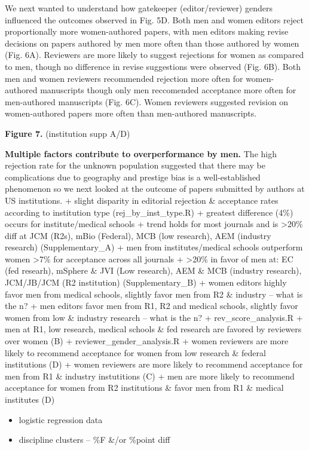 \documentclass[11pt,]{article}
\providecommand{\tightlist}{%
  \setlength{\itemsep}{0pt}\setlength{\parskip}{0pt}}
\begin{document}
We next wanted to understand how gatekeeper (editor/reviewer) genders
influenced the outcomes observed in Fig. 5D. Both men and women editors
reject proportionally more women-authored papers, with men editors
making revise decisions on papers authored by men more often than those
authored by women (Fig. 6A). Reviewers are more likely to suggest
rejections for women as compared to men, though no difference in revise
suggestions were observed (Fig. 6B). Both men and women reviewers
recommended rejection more often for women-authored manuscripts though
only men reccomended acceptance more often for men-authored manuscripts
(Fig. 6C). Women reviewers suggested revision on women-authored papers
more often than men-authored manuscripts.

\textbf{Figure 7.} (institution supp A/D)

\textbf{Multiple factors contribute to overperformance by men.} The high
rejection rate for the unknown population suggested that there may be
complications due to geography and prestige bias is a well-established
phenomenon so we next looked at the outcome of papers submitted by
authors at US institutions. + slight disparity in editorial rejection \&
acceptance rates according to institution type (rej\_by\_inst\_type.R) +
greatest difference (4\%) occurs for institute/medical schools + trend
holds for most journals and is \textgreater{}20\% diff at JCM (R2s),
mBio (Federal), MCB (low research), AEM (industry research)
(Supplementary\_A) + men from institutes/medical schools outperform
women \textgreater{}7\% for acceptance across all journals +
\textgreater{}20\% in favor of men at: EC (fed researh), mSphere \& JVI
(Low research), AEM \& MCB (industry research), JCM/JB/JCM (R2
institution) (Supplementary\_B) + women editors highly favor men from
medical schools, slightly favor men from R2 \& industry -- what is the
n? + men editors favor men from R1, R2 and medical schools, slightly
favor women from low \& industry research -- what is the n? +
rev\_score\_analysis.R + men at R1, low research, medical schools \& fed
research are favored by reviewers over women (B) +
reviewer\_gender\_analysis.R + women reviewers are more likely to
recommend acceptance for women from low research \& federal institutions
(D) + women reviewers are more likely to recommend acceptance for men
from R1 \& industry instutitions (C) + men are more likely to recommend
acceptance for women from R2 institutions \& favor men from R1 \&
medical institutes (D)

\begin{itemize}
\tightlist
\item
  logistic regression data
\item
  discipline clusters -- \%F \&/or \%point diff
\end{itemize}
\end{document}
